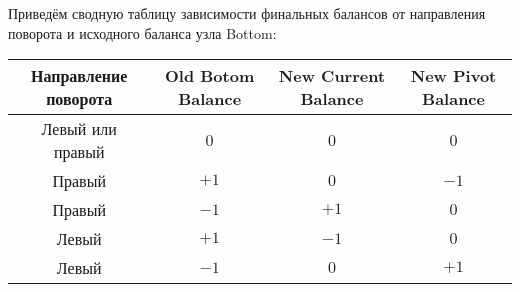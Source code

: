 \begin{frame}
    
    Приведём сводную таблицу зависимости финальных балансов от направления поворота и исходного баланса узла Bottom:

    \begin{table*}[ht]
        \centering
    
        \begin{tabular}{|c|c|c|c|}
            \hline
            Направление поворота & Old Botom Balance & New Current Balance & New Pivot Balance \\
            \hline
                Левый или правый &        $0$        &         $0$         &        $0$        \\
            \hline
                          Правый &        $+1$       &         $0$         &        $-1$       \\
            \hline
                          Правый &        $-1$       &         $+1$        &        $0$       \\
            \hline
                           Левый &        $+1$       &         $-1$        &        $0$       \\
            \hline
                           Левый &        $-1$       &         $0$         &        $+1$       \\
            \hline
        \end{tabular}
    
    \end{table*}

\end{frame}